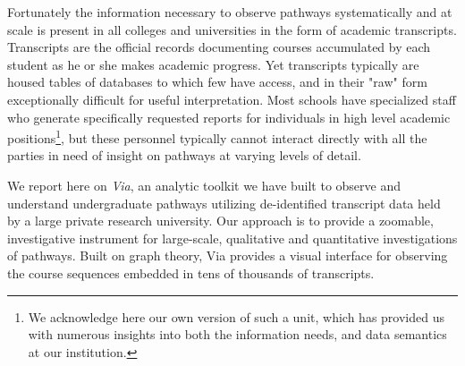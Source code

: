 


Fortunately the information necessary to observe pathways systematically and at scale is present in all colleges and universities in the form of academic transcripts. Transcripts are the official records documenting courses accumulated by each student as he or she makes academic progress. Yet transcripts typically are housed tables of databases to which few have access, and in their "raw" form exceptionally difficult for useful interpretation. Most schools have
specialized staff who generate specifically requested reports for
individuals in high level academic positions\footnote{We acknowledge
here our own version of such a unit, which has provided us with numerous insights into both the information needs, and data semantics at our institution.}, but these personnel typically cannot interact directly with all the parties in need of insight on pathways at varying levels of detail.


We report here on {\it Via}, an analytic toolkit we have built to observe and understand undergraduate pathways utilizing de-identified transcript data held by a large private research university. Our approach is to provide a zoomable, investigative
instrument for large-scale, qualitative and quantitative investigations of pathways. Built on graph theory, Via provides a visual interface for observing the course sequences embedded in tens of thousands of transcripts. 

